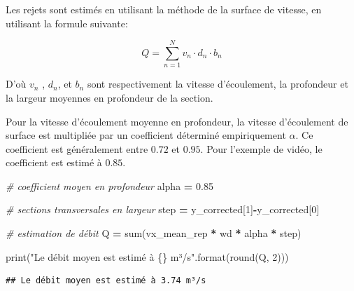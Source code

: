 \documentclass[
]{article}
\newenvironment{Shaded}{\begin{snugshade}}{\end{snugshade}}
\newcommand{\BuiltInTok}[1]{#1}
\newcommand{\CommentTok}[1]{\textcolor[rgb]{0.56,0.35,0.01}{\textit{#1}}}
\newcommand{\DecValTok}[1]{\textcolor[rgb]{0.00,0.00,0.81}{#1}}
\newcommand{\FloatTok}[1]{\textcolor[rgb]{0.00,0.00,0.81}{#1}}
\newcommand{\NormalTok}[1]{#1}
\newcommand{\OperatorTok}[1]{\textcolor[rgb]{0.81,0.36,0.00}{\textbf{#1}}}
\newcommand{\SpecialCharTok}[1]{\textcolor[rgb]{0.00,0.00,0.00}{#1}}
\newcommand{\StringTok}[1]{\textcolor[rgb]{0.31,0.60,0.02}{#1}}
\begin{document}
Les rejets sont estimés en utilisant la méthode de la surface de vitesse, en utilisant la formule suivante:

\begin{equation}
Q = \sum_{n=1}^{N} v_n \cdot d_n \cdot b_n
\end{equation}

D'où \(v_n\) , \(d_n\), et \(b_n\) sont respectivement la vitesse d'écoulement, la profondeur et la largeur moyennes en profondeur de la section.

Pour la vitesse d'écoulement moyenne en profondeur, la vitesse d'écoulement de surface est multipliée par un coefficient déterminé empiriquement \(\alpha\). Ce coefficient est généralement entre \(0.72\) et \(0.95\). Pour l'exemple de vidéo, le coefficient est estimé à
\(0.85\).

\begin{Shaded}
\begin{Highlighting}[]
\CommentTok{\# coefficient moyen en profondeur}
\NormalTok{alpha }\OperatorTok{=} \FloatTok{0.85}

\CommentTok{\# sections transversales en largeur}
\NormalTok{step }\OperatorTok{=}\NormalTok{ y\_corrected[}\DecValTok{1}\NormalTok{]}\OperatorTok{{-}}\NormalTok{y\_corrected[}\DecValTok{0}\NormalTok{]}

\CommentTok{\# estimation de débit}
\NormalTok{Q }\OperatorTok{=} \BuiltInTok{sum}\NormalTok{(vx\_mean\_rep }\OperatorTok{*}\NormalTok{ wd  }\OperatorTok{*}\NormalTok{ alpha }\OperatorTok{*}\NormalTok{ step)}

\BuiltInTok{print}\NormalTok{(}\StringTok{"Le débit moyen est estimé à }\SpecialCharTok{\{\}}\StringTok{ m³/s"}\NormalTok{.}\BuiltInTok{format}\NormalTok{(}\BuiltInTok{round}\NormalTok{(Q, }\DecValTok{2}\NormalTok{)))}
\end{Highlighting}
\end{Shaded}

\begin{verbatim}
## Le débit moyen est estimé à 3.74 m³/s
\end{verbatim}

\newpage

  
\end{document}
